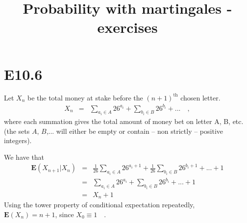 \documentclass[11pt]{article} %
\title{Probability with martingales - exercises}
\author{}
\date{} %
\begin{document}
{\bf \maketitle \par}


\section*{E10.6}

\vspace{\baselineskip}

Let $X_{n}$ be the total money at stake before the $\left(n+1\right)^{\mathrm{th}}$ chosen letter. \\
\begin{equation}
\begin{array}{lcl}
X_{n}&=&\displaystyle\sum_{a_{i} \in A} 26^{a_{i}}+\displaystyle\sum_{b_{i} \in B} 26^{b_{i}}+... \quad,
\end{array}
\end{equation} 
where each summation gives the total amount of money bet on letter A, B, etc. (the sets $A$, $B$,... will either be empty or contain -- non strictly --  positive integers).  


We have that\\
\begin{equation}
\begin{array}{lcl}
\mathrm{\textbf{E}}\left(X_{n+1}|X_{n}\right)&=&\displaystyle\frac{1}{26}\sum_{a_{i} \in A} 26^{a_{i}+1}+\frac{1}{26}\displaystyle\sum_{b_{i} \in B} 26^{b_{i}+1}+...+1 \\
&=&\displaystyle\sum_{a_{i} \in A} 26^{a_{i}}+\displaystyle\sum_{b_{i} \in B} 26^{b_{i}}+...+1\\
&=&X_{n}+1
\end{array}
\end{equation}
Using the tower property of conditional expectation repeatedly, \\
$\mathrm{\textbf{E}}\left(X_{n}\right)=n+1$, since $X_{0}\equiv 1 \quad.$
\end{document}
